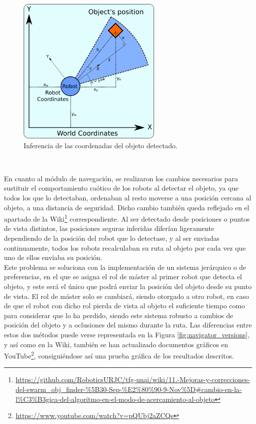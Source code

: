 \begin{figure} [h!]
  \begin{center}
    \includegraphics[width=7cm]{figs/coordinates_scheme}
  \end{center}
  \caption{Inferencia de las coordenadas del objeto detectado.}
  \label{fig:coords_infer}
\end{figure}\

En cuanto al módulo de navegación, se realizaron los cambios necesarios para
sustituir el comportamiento caótico de los robots al detectar el objeto, ya que
todos los que lo detectaban, ordenaban al resto moverse a una posición cercana
al objeto, a una distancia de seguridad.
Dicho cambio también queda reflejado en el apartado de la Wiki\footnote{
\url{https://github.com/RoboticsURJC/tfg-unai/wiki/11.-Mejoras-y-correcciones-del-swarm\_obj\_finder-\%5B30-Sep-\%E2\%80\%90-9-Nov\%5D\#cambio-en-la-l\%C3\%B3gica-del-algoritmo-en-el-modo-de-acercamiento-al-objeto}}
correspondiente.
Al ser detectado desde posiciones o puntos de vista distintos, las posiciones
seguras inferidas diferían ligeramente dependiendo de la posición del robot que
lo detectase, y al ser enviadas continuamente, todos los robots recalculaban su
ruta al objeto por cada vez que uno de ellos enviaba su posición.
\\

Este problema se soluciona con la implementación de un sistema jerárquico o de
preferencias, en el que se asigna el rol de máster al primer robot que detecta
el objeto, y este será el único que podrá enviar la posición del objeto desde su
punto de vista.
El rol de máster solo se cambiará, siendo otorgado a otro robot, en caso de que
el robot con dicho rol pierda de vista al objeto el suficiente tiempo como para
considerar que lo ha perdido, siendo este sistema robusto a cambios de posición
del objeto y a oclusiones del mismo durante la ruta.
Las diferencias entre estos dos métodos puede verse representada en la Figura
\ref{fig:navigator_versions}, y así como en la Wiki, también se han actualizado
documentos gráficos en YouTube\footnote{
\url{https://www.youtube.com/watch?v=pQUbj2aZCQs}}, consiguiéndose así una
prueba gráfica de los resultados descritos.
\\

